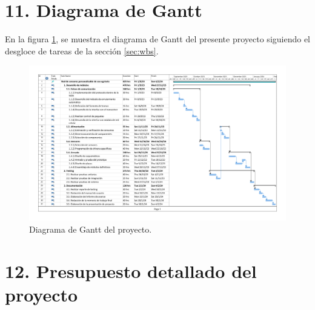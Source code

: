 \documentclass[
11pt, %
codirector, %
]{charter}
\begin{document}
\section{11. Diagrama de Gantt}
\label{sec:gantt}

En la figura \ref{fig:diagGantt}, se muestra el diagrama de Gantt del presente proyecto siguiendo el desgloce de tareas de la sección \ref{sec:wbs}.

\begin{landscape}
\begin{figure}[htpb]
\centering 
\includegraphics[height=.90\textheight]{./Figuras/gantt.pdf}
\caption{Diagrama de Gantt del proyecto.}
\label{fig:diagGantt}
\end{figure}

\end{landscape}


\section{12. Presupuesto detallado del proyecto}
\label{sec:presupuesto}
\end{document}
